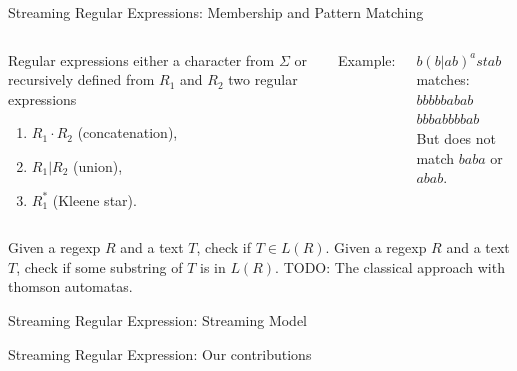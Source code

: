 \documentclass[aspectratio=169]{beamer}
\begin{document}
\begin{frame}{Streaming Regular Expressions: Membership and Pattern Matching}
    \begin{columns}
        \begin{block}{Regular expressions}
            either a character from $\Sigma$ or recursively defined from $R_1$ and $R_2$ two regular expressions
            \pause
            \begin{enumerate}
                \item $R_1 \cdot R_2$ (concatenation),
                \pause
                \item $R_1 | R_2$ (union),
                \pause
                \item $R_1^\ast$ (Kleene star).
            \end{enumerate}
            \pause
        \end{block}
        Example:
        \begin{center}
            $b(b|ab)^astab$ matches:\\
            \checkmark $bbbbbabab$ \\
            \checkmark $bbbabbbbab$\\
            But does not match $baba$ or $abab$.
        \end{center}
    \end{columns}    
    \pause
    \bigskip
    {
         Given a regexp $R$ and a text $T$, check if $T\in L(R)$.
         Given a regexp $R$ and a text $T$, check if some substring of $T$ is in $L(R)$.
    }
    TODO: The classical approach with thomson automatas. 
\end{frame}

\begin{frame}{Streaming Regular Expression: Streaming Model}
    
\end{frame}

\begin{frame}{Streaming Regular Expression: Our contributions}
    
\end{frame}
\end{document}
